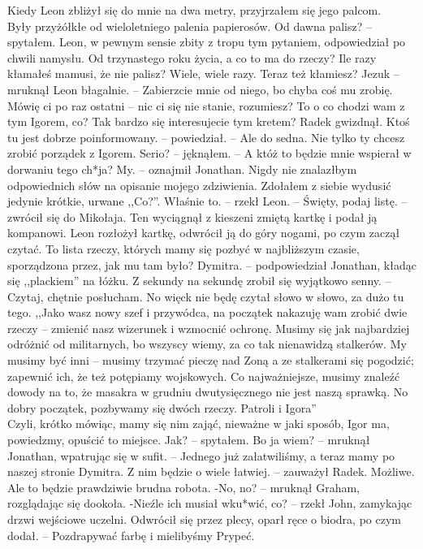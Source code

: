 \documentclass[../MAIN.tex]{subfiles}
\begin{document}
Kiedy Leon zbliżył się do mnie na dwa metry, przyjrzałem się jego palcom.\\
Były przyżółkłe od wieloletniego palenia papierosów.
\sx Od dawna palisz? -- spytałem. Leon, w pewnym sensie zbity z tropu tym pytaniem, odpowiedział po chwili namysłu.
\xx Od trzynastego roku życia, a co to ma do rzeczy?
\xx Ile razy kłamałeś mamusi, że nie palisz?
\xx Wiele, wiele razy.
\xx Teraz też kłamiesz?
\xx Jezu\3k -- mruknął Leon błagalnie. -- Zabierzcie mnie od niego, bo chyba coś mu zrobię. Mówię ci po raz ostatni -- nic ci się nie stanie, rozumiesz?
\xx To o co chodzi wam z tym Igorem, co? Tak bardzo się interesujecie tym kretem?
\qd
Radek gwizdnął.
\sx Ktoś tu jest dobrze poinformowany. -- powiedział. -- Ale do sedna. Nie tylko ty chcesz zrobić porządek z Igorem.
\xx Serio? -- jęknąłem. -- A któż to będzie mnie wspierał w dorwaniu tego ch*ja?
\xx My. -- oznajmił Jonathan.
\qd
Nigdy nie znalazłbym odpowiednich słów na opisanie mojego zdziwienia. Zdołałem z siebie wydusić jedynie krótkie, urwane ,,Co?''.
\sx Właśnie to. -- rzekł Leon. -- Święty, podaj listę. -- zwrócił się do Mikołaja. Ten wyciągnął z kieszeni zmiętą kartkę i podał ją kompanowi.
\qd
Leon rozłożył kartkę, odwrócił ją do góry nogami, po czym zaczął czytać.
\sx To lista rzeczy, których mamy się pozbyć w najbliższym czasie, sporządzona przez, jak mu tam było?
\xx Dymitra. -- podpowiedział Jonathan, kładąc się ,,plackiem'' na łóżku. Z sekundy na sekundę zrobił się wyjątkowo senny. -- Czytaj, chętnie posłucham.
\xx No więc\3k nie będę czytał słowo w słowo, za dużo tu tego. ,,Jako wasz nowy szef i przywódca, na początek nakazuję wam zrobić dwie rzeczy -- zmienić nasz wizerunek i wzmocnić ochronę. Musimy się jak najbardziej odróżnić od militarnych, bo wszyscy wiemy, za co tak nienawidzą stalkerów. My musimy być inni -- musimy trzymać pieczę nad Zoną a ze stalkerami się pogodzić; zapewnić ich, że też potępiamy wojskowych. Co najważniejsze, musimy znaleźć dowody na to, że masakra w grudniu dwutysięcznego nie jest naszą sprawką. No dobry początek, pozbywamy się dwóch rzeczy. Patroli i Igora''\\
Czyli, krótko mówiąc, mamy się nim zająć, nieważne w jaki sposób, Igor ma, powiedzmy, opuścić to miejsce.
\xx Jak? -- spytałem.
\xx Bo ja wiem? -- mruknął Jonathan, wpatrując się w sufit. -- Jednego już załatwiliśmy, a teraz mamy po naszej stronie Dymitra.
\xx Z nim będzie o wiele łatwiej. -- zauważył Radek.
\xx Możliwe. Ale to będzie prawdziwie brudna robota.
\qd
% 
% 
-No, no? -- mruknął Graham, rozglądając się dookoła.
-Nieźle ich musiał wku*wić, co? -- rzekł John, zamykając drzwi wejściowe uczelni. Odwrócił się przez plecy, oparł ręce o biodra, po czym dodał. -- Pozdrapywać farbę i mielibyśmy Prypeć.
\end{document}
